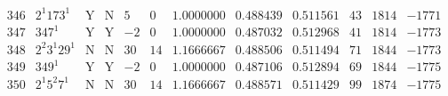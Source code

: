\documentclass[11pt,reqno,a4letter]{article}
\numberwithin{figure}{section}
\numberwithin{table}{section}
\theoremstyle{plain}
\numberwithin{theorem}{section}
\theoremstyle{definition}
\begin{document}
\begin{table}[h!]
\begin{equation*}
{\begin{array}{cc|cc|ccc|cc|ccc}
 346 & 2^1 173^1 & \text{Y} & \text{N} & 5 & 0 & 1.0000000 & 0.488439 & 0.511561 & 43 & 1814 & -1771 \\
 347 & 347^1 & \text{Y} & \text{Y} & -2 & 0 & 1.0000000 & 0.487032 & 0.512968 & 41 & 1814 & -1773 \\
 348 & 2^2 3^1 29^1 & \text{N} & \text{N} & 30 & 14 & 1.1666667 & 0.488506 & 0.511494 & 71 & 1844 & -1773 \\
 349 & 349^1 & \text{Y} & \text{Y} & -2 & 0 & 1.0000000 & 0.487106 & 0.512894 & 69 & 1844 & -1775 \\
 350 & 2^1 5^2 7^1 & \text{N} & \text{N} & 30 & 14 & 1.1666667 & 0.488571 & 0.511429 & 99 & 1874 & -1775 \\ 
\end{array}
}
\end{equation*}

\end{table} 
\end{document}
